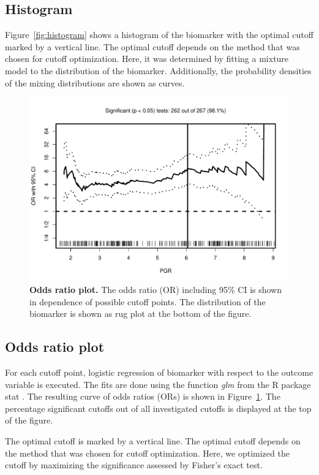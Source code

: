 \documentclass[12pt, a4paper]{article}
\begin{document}
\subsection{Histogram}
Figure~\ref{fig:histogram} shows a histogram of the biomarker with the optimal cutoff marked by a vertical line. The optimal cutoff depends on the method that was chosen for cutoff optimization.
Here, it was determined by fitting a mixture model to the distribution of the biomarker.
Additionally, the probability densities of the mixing distributions are shown as curves.

\newpage

\begin{figure}[t]
\centering
\includegraphics{Cutoff_Finder_manual-003}
\caption{\textbf{Odds ratio plot.}
The odds ratio (OR) including 95\% CI is shown in dependence of possible cutoff points.
The distribution of the biomarker is shown as rug plot at the bottom of the figure.}
\label{fig:or}
\end{figure}

\subsection{Odds ratio plot}
For each cutoff point, logistic regression of biomarker with respect to the outcome variable is executed.
The fits are done using the function \emph{glm} from the R package stat \cite{R}.
The resulting curve of odds ratios (ORs) is shown in Figure~\ref{fig:or}.
The percentage significant cutoffs out of all investigated cutoffs is displayed at the top of the figure.

The optimal cutoff is marked by a vertical line.
The optimal cutoff depends on the method that was chosen for cutoff optimization.
Here, we optimized the cutoff by maximizing the significance assessed by Fisher's exact test.
\end{document}
